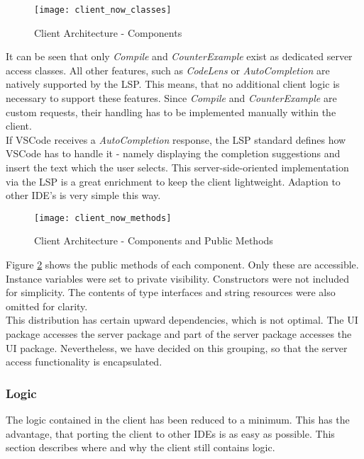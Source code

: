 \begin{figure}[h]
    \centering
    \texttt{[image: client\_now\_classes]}
    \caption{Client Architecture - Components}
    \label{fig:client_now_classes}
\end{figure}

It can be seen that only \textit{Compile} and \textit{CounterExample} exist as dedicated server access classes.
All other features, such as \textit{CodeLens} or \textit{AutoCompletion} are natively supported by the LSP.
This means, that no additional client logic is necessary to support these features.
Since \textit{Compile} and \textit{CounterExample} are custom requests,
their handling has to be implemented manually within the client.\\

If VSCode receives a \textit{AutoCompletion} response, the LSP standard defines how VSCode has to handle it -
namely displaying the completion suggestions and insert the text which the user selects.
This server-side-oriented implementation via the LSP is a great enrichment to keep the client lightweight.
Adaption to other IDE's is very simple this way.

\begin{figure}[h]
    \centering
    \texttt{[image: client\_now\_methods]}
    \caption{Client Architecture - Components and Public Methods}
    \label{fig:client_now_methods}
\end{figure}

Figure \ref{fig:client_now_methods} shows the public methods of each component.
Only these are accessible.
Instance variables were set to private visibility.
Constructors were not included for simplicity.
The contents of type interfaces and string resources were also omitted for clarity.\\

This distribution has certain upward dependencies, which is not optimal.
The UI package accesses the server package and part of the server package accesses the UI package.
Nevertheless, we have decided on this grouping,
so that the server access functionality is encapsulated.

\subsubsection{Logic}
The logic contained in the client has been reduced to a minimum.
This has the advantage, that porting the client to other IDEs is as easy as possible.
This section describes where and why the client still contains logic.\\

